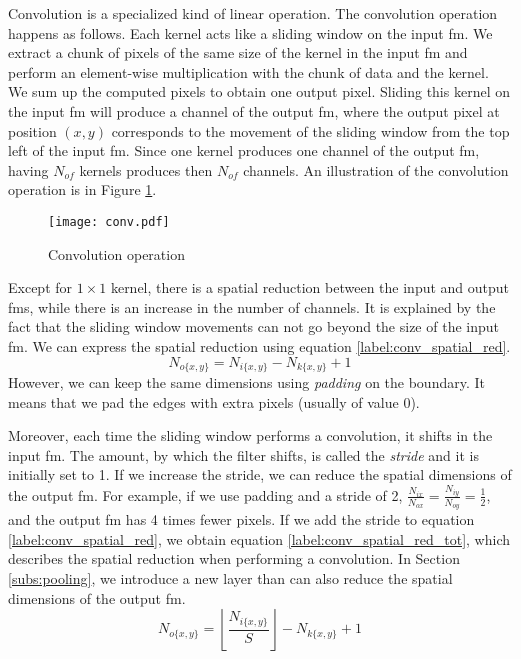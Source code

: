 Convolution is a specialized kind of linear operation. The convolution operation happens as follows. Each kernel acts like a sliding window on the input \acrshort{fm}. We extract a chunk of pixels of the same size of the kernel in the input \acrshort{fm} and perform an element-wise multiplication with the chunk of data and the kernel. We sum up the computed pixels to obtain one output pixel. Sliding this kernel on the input \acrshort{fm} will produce a channel of the output \acrshort{fm}, where the output pixel at position $(x, y)$ corresponds to the movement of the sliding window from the top left of the input \acrshort{fm}. Since one kernel produces one channel of the output \acrshort{fm}, having $N_{of}$ kernels produces then $N_{of}$ channels. An illustration of the convolution operation is in Figure \ref{fig:convolution}.
%
\begin{figure}
    \centering
    \texttt{[image: conv.pdf]}
    \caption{Convolution operation}
    \label{fig:convolution}
\end{figure}

Except for $1 \times 1$ kernel, there is a spatial reduction between the input and output \acrshort{fm}s, while there is an increase in the number of channels. It is explained by the fact that the sliding window movements can not go beyond the size of the input \acrshort{fm}. We can express the spatial reduction using equation \eqref{label:conv_spatial_red}.
%
\begin{equation}
    N_{o\{x,y\}} = N_{i\{x,y\}} - N_{k\{x,y\}} + 1
    \label{label:conv_spatial_red}
\end{equation}
%
However, we can keep the same dimensions using \textit{padding} on the boundary. It means that we pad the edges with extra pixels (usually of value 0).

Moreover, each time the sliding window performs a convolution, it shifts in the input \acrshort{fm}. The amount, by which the filter shifts, is called the \textit{stride} and it is initially set to 1. If we increase the stride, we can reduce the spatial dimensions of the output \acrshort{fm}. For example, if we use padding and a stride of 2, $\frac{N_{ix}}{N_{ox}} = \frac{N_{iy}}{N_{oy}} = \frac{1}{2}$, and the output \acrshort{fm} has 4 times fewer pixels. If we add the stride to equation \eqref{label:conv_spatial_red}, we obtain equation \eqref{label:conv_spatial_red_tot}, which describes the spatial reduction when performing a convolution. In Section \ref{subs:pooling}, we introduce a new layer than can also reduce the spatial dimensions of the output \acrshort{fm}.
%
\begin{equation}
    N_{o\{x,y\}} = \left\lfloor \frac{ N_{i\{x,y\}}}{S} \right\rfloor - N_{k\{x,y\}} + 1
    \label{label:conv_spatial_red_tot}
\end{equation}

